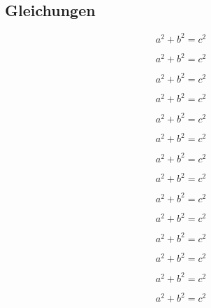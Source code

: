 \documentclass[ngerman]{scrartcl}
\begin{document}
	\subsection{Gleichungen}

	\begin{equation}
		a^2+b^2=c^2 \label{eqn:eqn}
	\end{equation}

	\begin{equation}
		a^2+b^2=c^2
	\end{equation}

	\begin{equation}
		a^2+b^2=c^2
	\end{equation}

	\begin{equation}
		a^2+b^2=c^2
	\end{equation}

	\begin{equation}
		a^2+b^2=c^2
	\end{equation}

	\begin{equation}
		a^2+b^2=c^2
	\end{equation}

	\begin{equation}
		a^2+b^2=c^2
	\end{equation}

	\begin{equation}
		a^2+b^2=c^2
	\end{equation}

	\begin{equation}
		a^2+b^2=c^2
	\end{equation}

	\begin{equation}
		a^2+b^2=c^2
	\end{equation}

	\begin{equation}
		a^2+b^2=c^2
	\end{equation}

	\begin{equation}
		a^2+b^2=c^2
	\end{equation}

	\begin{equation}
		a^2+b^2=c^2
	\end{equation}

	\begin{equation}
		a^2+b^2=c^2
	\end{equation}
\end{document}
